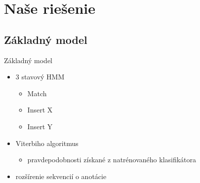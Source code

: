 \documentclass[xcolor=dvipsnames, compress, 12pt]{beamer}
\begin{document}
\section{Naše riešenie}

\subsection{Základný model}
\begin{frame}{Základný model}
  \begin{itemize}
    \item 3 stavový HMM
    \begin{itemize}
      \item Match
      \item Insert X
      \item Insert Y
    \end{itemize} 
    \pause
    \item Viterbiho algoritmus
    \begin{itemize}
      \item pravdepodobnosti získané z natrénovaného klasifikátora
	\end{itemize}    
	\pause
	\item rozšírenie sekvencií o anotácie
  \end{itemize} 
\end{frame}
\end{document}
